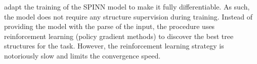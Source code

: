 


\textcite{yogatama_17} adapt the training of the \textsc{SPINN} model to make it fully differentiable. As such, the model does not require any structure supervision during training. Instead of providing the model with the parse of the input, the procedure uses reinforcement learning (policy gradient methods) to discover the best tree structures for the task. However, the reinforcement learning strategy is notoriously slow and limits the convergence speed.




